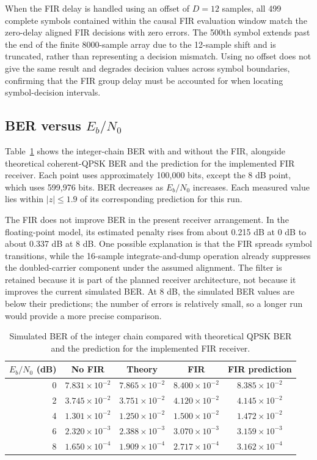 \documentclass[10pt,twocolumn,letterpaper]{article}
\begin{document}
When the FIR delay is handled using an offset of $D = 12$ samples, all 499 complete symbols contained within the causal FIR evaluation window match the zero-delay aligned FIR decisions with zero errors. The 500th symbol extends past the end of the finite 8000-sample array due to the 12-sample shift and is truncated, rather than representing a decision mismatch. Using no offset does not give the same result and degrades decision values across symbol boundaries, confirming that the FIR group delay must be accounted for when locating symbol-decision intervals.

\subsection{BER versus $E_b/N_0$}
Table~\ref{tab:ber} shows the integer-chain BER with and without the FIR, alongside theoretical coherent-QPSK BER and the prediction for the implemented FIR receiver. Each point uses approximately 100,000 bits, except the 8 dB point, which uses 599,976 bits. BER decreases as $E_b/N_0$ increases. Each measured value lies within $|z|\leq 1.9$ of its corresponding prediction for this run.

The FIR does not improve BER in the present receiver arrangement. In the floating-point model, its estimated penalty rises from about 0.215 dB at 0 dB to about 0.337 dB at 8 dB. One possible explanation is that the FIR spreads symbol transitions, while the 16-sample integrate-and-dump operation already suppresses the doubled-carrier component under the assumed alignment. The filter is retained because it is part of the planned receiver architecture, not because it improves the current simulated BER. At 8 dB, the simulated BER values are below their predictions; the number of errors is relatively small, so a longer run would provide a more precise comparison.

\begin{table}[t]
\centering\color{blue}
\small
\begin{tabular}{@{}rcccc@{}}
\toprule
$E_b/N_0$ (dB) & No FIR & Theory & FIR & FIR prediction \\
\midrule
0 & $7.831\times10^{-2}$ & $7.865\times10^{-2}$ & $8.400\times10^{-2}$ & $8.385\times10^{-2}$ \\
2 & $3.745\times10^{-2}$ & $3.751\times10^{-2}$ & $4.120\times10^{-2}$ & $4.145\times10^{-2}$ \\
4 & $1.301\times10^{-2}$ & $1.250\times10^{-2}$ & $1.500\times10^{-2}$ & $1.472\times10^{-2}$ \\
6 & $2.320\times10^{-3}$ & $2.388\times10^{-3}$ & $3.070\times10^{-3}$ & $3.159\times10^{-3}$ \\
8 & $1.650\times10^{-4}$ & $1.909\times10^{-4}$ & $2.717\times10^{-4}$ & $3.162\times10^{-4}$ \\
\bottomrule
\end{tabular}
\caption{Simulated BER of the integer chain compared with theoretical QPSK BER and the prediction for the implemented FIR receiver.}
\label{tab:ber}
\end{table}
\end{document}
